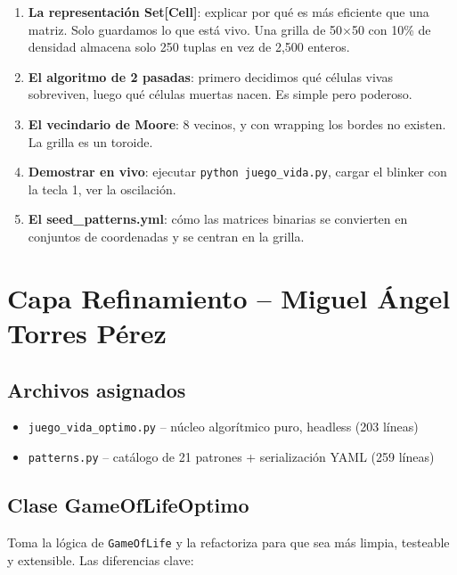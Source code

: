\documentclass[12pt,a4paper]{article}
\begin{document}
\begin{enumerate}
  \item \textbf{La representación Set[Cell]}: explicar por qué es más eficiente que una matriz.
        Solo guardamos lo que está vivo. Una grilla de 50$\times$50 con 10\% de densidad
        almacena solo 250 tuplas en vez de 2,500 enteros.
  \item \textbf{El algoritmo de 2 pasadas}: primero decidimos qué células vivas sobreviven,
        luego qué células muertas nacen. Es simple pero poderoso.
  \item \textbf{El vecindario de Moore}: 8 vecinos, y con wrapping los bordes no existen.
        La grilla es un toroide.
  \item \textbf{Demostrar en vivo}: ejecutar \texttt{python juego\_vida.py}, cargar el
        blinker con la tecla 1, ver la oscilación.
  \item \textbf{El seed\_patterns.yml}: cómo las matrices binarias se convierten en
        conjuntos de coordenadas y se centran en la grilla.
\end{enumerate}

\newpage

\section{Capa Refinamiento -- Miguel Ángel Torres Pérez}

\subsection{Archivos asignados}

\begin{itemize}
  \item \texttt{juego\_vida\_optimo.py} -- núcleo algorítmico puro, headless (203 líneas)
  \item \texttt{patterns.py} -- catálogo de 21 patrones + serialización YAML (259 líneas)
\end{itemize}

\subsection{Clase GameOfLifeOptimo}

Toma la lógica de \texttt{GameOfLife} y la refactoriza para que sea más limpia,
testeable y extensible. Las diferencias clave:
\end{document}
